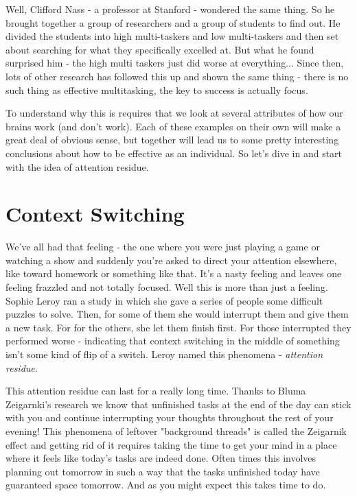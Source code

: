 \documentclass[11pt,a5paper]{book}
\begin{document}
Well, Clifford Nass - a professor at Stanford - wondered the same thing. So he brought together a group of researchers and a group of students to find out. He divided the students into high multi-taskers and low multi-taskers and then set about searching for what they specifically excelled at. But what he found surprised him - the high multi taskers just did worse at everything... Since then, lots of other research has followed this up and shown the same thing - there is no such thing as effective multitasking, the key to success is actually focus. \cite{keller}
\newline

To understand why this is requires that we look at several attributes of how our brains work (and don't work). Each of these examples on their own will make a great deal of obvious sense, but together will lead us to some pretty interesting conclusions about how to be effective as an individual. So let's dive in and start with the idea of attention residue.

\section{Context Switching}

We've all had that feeling - the one where you were just playing a game or watching a show and suddenly you're asked to direct your attention elsewhere, like toward homework or something like that. It's a nasty feeling and leaves one feeling frazzled and not totally focused. Well this is more than just a feeling. Sophie Leroy ran a study in which she gave a series of people some difficult puzzles to solve. Then, for some of them she would interrupt them and give them a new task. For for the others, she let them finish first. For those interrupted they performed worse - indicating that context switching in the middle of something isn't some kind of flip of a switch. Leroy named this phenomena - \textit{attention residue}. 
\newline

This attention residue can last for a really long time. Thanks to Bluma Zeigarnki's research we know that unfinished tasks at the end of the day can stick with you and continue interrupting your thoughts throughout the rest of your evening! This phenomena of leftover "background threads" is called the Zeigarnik effect \cite{newport} and getting rid of it requires taking the time to get your mind in a place where it feels like today's tasks are indeed done. Often times this involves planning out tomorrow in such a way that the tasks unfinished today have guaranteed space tomorrow. And as you might expect this takes time to do. 
\newline
\end{document}
